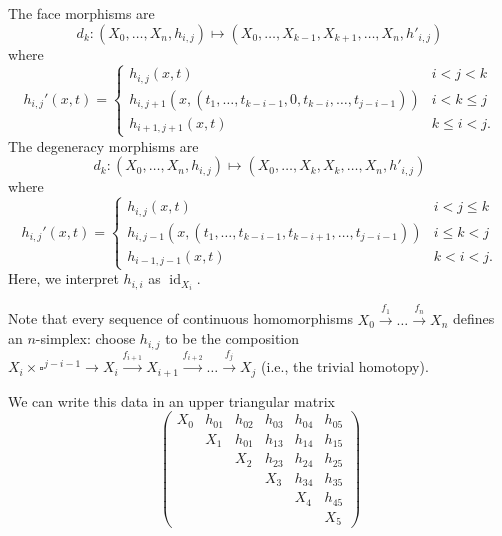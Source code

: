 \documentclass[a4paper]{amsart}
\numberwithin{figure}{section}
\theoremstyle{theorem}
\theoremstyle{definition}
\newcommand{\Top}{{Top}}
\DeclareMathOperator{\id}{id}
\begin{document}
The face morphisms are
\[ d_k: (X_0, \dots, X_n, h_{i,j}) \mapsto (X_0, \dots, X_{k-1}, X_{k+1}, \dots, X_n, h'_{i,j}) \]
where 
\[ h_{i,j}'(x,t) = 
\left \{ \begin{array}{cc}
h_{i,j}(x,t) & i < j < k \\
h_{i,j{+}1}(x, (t_1, \dots, t_{k{-}i{-}1}, 0, t_{k{-}i}, \dots, t_{j{-}i{-}1})) & i < k \leq j \\
h_{i{+}1,j{+}1}(x,t) & k \leq i < j.
\end{array} \right .\]
The degeneracy morphisms are 
\[ d_k: (X_0, \dots, X_n, h_{i,j}) \mapsto (X_0, \dots, X_{k}, X_{k}, \dots, X_n, h'_{i,j}) \]
where 
\[ h_{i,j}'(x,t) = 
\left \{ \begin{array}{cc}
h_{i,j}(x,t) & i < j \leq k \\
h_{i,j{-}1}(x, (t_1, \dots, t_{k{-}i{-}1}, t_{k{-}i{+}1}, \dots, t_{j{-}i{-}1})) & i \leq k < j \\
h_{i{-}1,j{-}1}(x,t) & k < i < j.
\end{array} \right .\]
Here, we interpret $h_{i,i}$ as $\id_{X_i}$. 

Note that every sequence of continuous homomorphisms $X_0 \stackrel{f_1}{\to} \dots \stackrel{f_n}{\to} X_n$ defines an $n$-simplex: choose $h_{i,j}$ to be the composition $X_i {\times} \square^{j{-}i{-}1} \to X_i \stackrel{f_{i{+}1}}{\to} X_{i {+} 1} \stackrel{f_{i{+}2}}{\to} \dots \stackrel{f_{j}}{\to} X_{j}$ (i.e., the trivial homotopy).

We can write this data in an upper triangular matrix
\[ \left ( 
\begin{array}{cccccc}
X_0 
& h_{01} 
& h_{02} 
& h_{03} 
& h_{04} 
& h_{05} 
\\
& X_1 & h_{01} & h_{13} & h_{14} & h_{15}   \\
& & X_2  & h_{23} & h_{24} & h_{25}  \\
& & & X_3  & h_{34} & h_{35} \\
& & & & X_4  & h_{45}   \\
& & & & & X_5 
\end{array}
\right ) \]
\end{document}
